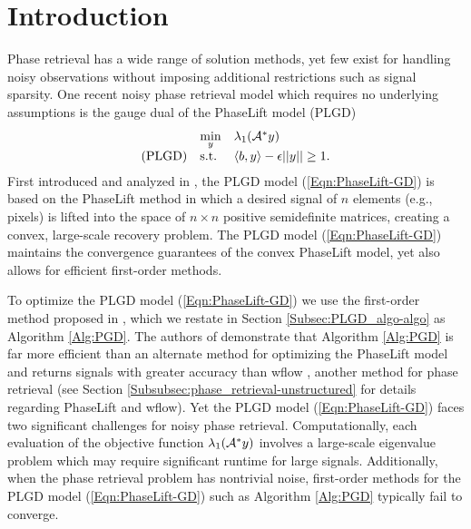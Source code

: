 \chapter{Introduction}  \label{Sec:Intro}			\label{Sec:intro}




Phase retrieval has a wide range of solution methods, yet few exist for handling noisy observations without imposing additional restrictions such as signal sparsity.  One recent noisy phase retrieval model which requires no underlying assumptions is the gauge dual of the PhaseLift model (PLGD)
\begin{equation} \label{Eqn:PhaseLift-GD}
\begin{array}{lll}
	&	\min\limits_{\substack{y}}
		&	\lambda_1({\mathcal A}^* y)
		\\
\textnormal{(PLGD)}
	&	\textnormal{s.t.}
		&	\langle b, y \rangle - \epsilon ||y|| \geq 1.
\end{array}
\end{equation}
First introduced and analyzed in \cite{DBLP:journals/siamsc/FriedlanderM16}, the PLGD model (\ref{Eqn:PhaseLift-GD}) is based on the PhaseLift method \cite{DBLP:journals/siamis/CandesESV13} in which a desired signal of $n$ elements (e.g., pixels) is lifted into the space of $n \times n$ positive semidefinite matrices, creating a convex, large-scale recovery problem.  
The PLGD model (\ref{Eqn:PhaseLift-GD}) maintains the convergence guarantees of the convex PhaseLift model, yet also allows for efficient first-order methods.


To optimize the PLGD model (\ref{Eqn:PhaseLift-GD}) we use the first-order method proposed in \cite[Section 4.4]{DBLP:journals/siamsc/FriedlanderM16}, which we restate in Section \ref{Subsec:PLGD_algo-algo} as Algorithm \ref{Alg:PGD}.
The authors of \cite{DBLP:journals/siamsc/FriedlanderM16} demonstrate that Algorithm \ref{Alg:PGD} is far more efficient than an alternate method for optimizing the PhaseLift model and returns signals with greater accuracy than wflow \cite{DBLP:journals/tit/CandesLS15}, another method for phase retrieval (see Section \ref{Subsubsec:phase_retrieval-unstructured} for details regarding PhaseLift and wflow).  
Yet the PLGD model (\ref{Eqn:PhaseLift-GD}) faces two significant challenges for noisy phase retrieval.  Computationally, each evaluation of the objective function $\lambda_1({\mathcal A}^*y)$ involves a large-scale eigenvalue problem which may require significant runtime for large signals.  Additionally, when the phase retrieval problem has nontrivial noise, first-order methods for the PLGD model (\ref{Eqn:PhaseLift-GD}) such as Algorithm \ref{Alg:PGD} typically fail to converge.


